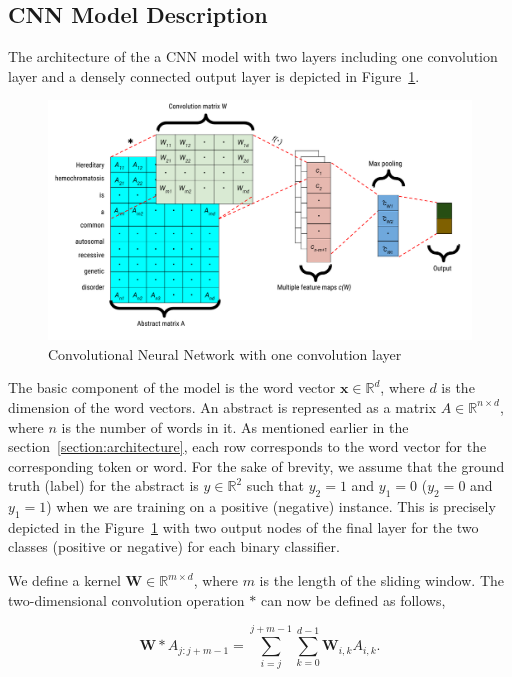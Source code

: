 \subsection{CNN Model Description}
The architecture of the a CNN model with two layers including one convolution layer and a densely connected output layer is depicted in Figure~\ref{fig:Cnn_one_layer}.
\begin{figure}[!htb]
    \centering
    \includegraphics[scale=0.45]{Figures/cnn-model-example.png}
    \caption{Convolutional Neural Network with one convolution layer}
    \label{fig:Cnn_one_layer}
\end{figure}
The basic component of the model is the word vector $\mathbf{x} \in \mathbb{R}^d$, where $d$ is the dimension of the word vectors. An abstract is represented as a matrix $A \in \mathbb{R}^{n \times d}$, where $n$ is the number of words in it. As mentioned earlier in the section~\ref{section:architecture}, each row corresponds to the word vector for the corresponding token or word. For the sake of brevity, we assume that the ground truth (label) for the abstract is $y \in \mathbb{R}^2$ such that $y_2 = 1$ and $y_1 = 0$ ($y_2 = 0$ and $y_1 = 1$) when we are training on a positive (negative) instance. This is precisely depicted in the Figure~\ref{fig:Cnn_one_layer} with two output nodes of the final layer for the two classes (positive or negative) for each binary classifier.

We define a kernel $\mathbf{W} \in \mathbb{R}^{m \times d}$, where $m$ is the length of the sliding window. The two-dimensional convolution operation $\mathbf{*}$ can now be defined as follows,

\begin{center}
\[\mathbf{W} * A_{j:j+m-1} = \sum_{i=j}^{j+m-1} \sum_{k=0}^{d-1} \mathbf{W}_{i,k} A_{i,k}.
\]
\end{center}

